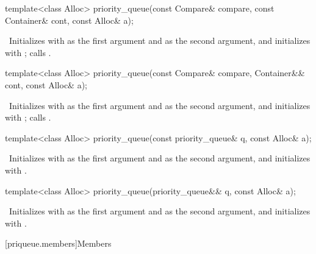 \begin{codeblock}
\begin{codeblock}
%
\begin{itemdecl}
template<class Alloc>
  priority_queue(const Compare& compare, const Container& cont, const Alloc& a);
\end{itemdecl}

\begin{itemdescr}
\pnum
\effects\ Initializes  with  as the first argument and  as the second
argument, and initializes  with ;
calls .
\end{itemdescr}

%
\begin{itemdecl}
template<class Alloc>
  priority_queue(const Compare& compare, Container&& cont, const Alloc& a);
\end{itemdecl}

\begin{itemdescr}
\pnum
\effects\ Initializes  with  as the first argument and 
as the second argument, and initializes  with ;
calls .
\end{itemdescr}

%
\begin{itemdecl}
template<class Alloc> priority_queue(const priority_queue& q, const Alloc& a);
\end{itemdecl}

\begin{itemdescr}
\pnum
\effects\ Initializes  with  as the first argument and  as
the second argument, and initializes  with .
\end{itemdescr}

%
\begin{itemdecl}
template<class Alloc> priority_queue(priority_queue&& q, const Alloc& a);
\end{itemdecl}

\begin{itemdescr}
\pnum
\effects\ Initializes  with  as the first argument and 
as the second argument, and initializes  with .
\end{itemdescr}

[priqueue.members]{Members}


\end{codeblock}
\end{codeblock}
